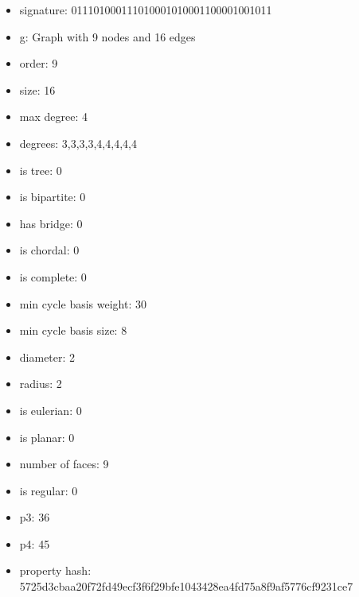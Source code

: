 \newpage
\begin{figure}
\end{figure}
\begin{itemize}
\item signature: 011101000111010001010001100001001011
\item g: Graph with 9 nodes and 16 edges
\item order: 9
\item size: 16
\item max degree: 4
\item degrees: 3,3,3,3,4,4,4,4,4
\item is tree: 0
\item is bipartite: 0
\item has bridge: 0
\item is chordal: 0
\item is complete: 0
\item min cycle basis weight: 30
\item min cycle basis size: 8
\item diameter: 2
\item radius: 2
\item is eulerian: 0
\item is planar: 0
\item number of faces: 9
\item is regular: 0
\item p3: 36
\item p4: 45
\item property hash: 5725d3cbaa20f72fd49ecf3f6f29bfe1043428ea4fd75a8f9af5776cf9231ce7
\end{itemize}
